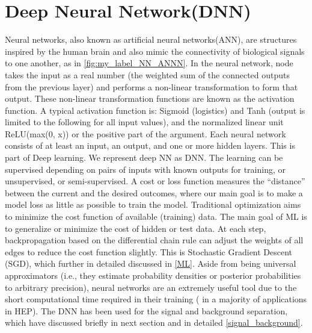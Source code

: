 \section{Deep Neural Network(DNN)}
Neural networks, also known as artificial neural networks(ANN), are structures inspired by the human brain and also mimic the connectivity of biological signals to one another, as in \autoref{fig:my_label_NN_ANNN}.
In the neural network, node takes the input as a real number (the weighted sum of the connected outputs from the previous layer) and performs a non-linear transformation to form that output\cite{Bourilkov_2019}.
These non-linear transformation functions are known as the activation function. A typical activation function is: Sigmoid (logistics) and Tanh (output is limited to the following for all input values), and the normalized linear unit ReLU(max(0, x)) or the positive part of the argument. Each neural network consists of at least an input, an output, and one or more hidden layers\cite{Sarker2021}. This is part of Deep learning. We represent deep NN as DNN. The learning can be supervised depending on pairs of inputs with known outputs for training, or unsupervised, or semi-supervised. A cost or loss function measures the “distance” between the current and the desired outcomes, where our main goal is to make a model loss as little as possible to train the model. Traditional optimization aims to minimize the cost function of available (training) data. The main goal of ML is to generalize or minimize the cost of hidden or test data. At each step,  backpropagation based on the differential chain rule can adjust the weights of all edges to reduce the cost function slightly. This is Stochastic Gradient Descent (SGD), which further in detailed discussed in \autoref{ML}. 
Aside from being universal approximators (i.e., they estimate probability densities or posterior probabilities to arbitrary precision), neural networks are an extremely useful tool due to the short computational time required in their training ( in a majority of applications in HEP)\cite{https://doi.org/10.48550/arxiv.2003.05199}. The DNN has been used for the signal and background separation, which have discussed briefly in next section and in detailed \autoref{signal_background}.
